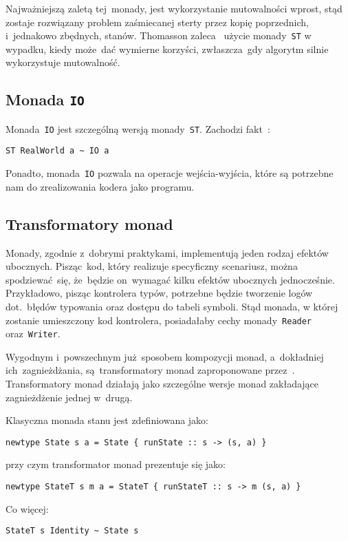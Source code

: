 \documentclass[../../thesis.tex]{subfiles}
\begin{document}
Najważniejszą zaletą tej~monady, jest wykorzystanie mutowalności wprost, stąd zostaje rozwiązany
problem zaśmiecanej sterty przez kopię poprzednich, i~jednakowo zbędnych, stanów.
Thomasson zaleca~\cite{Thomasson:HHPP} użycie monady~\texttt{ST} w wypadku, kiedy
może~dać wymierne korzyści, zwłaszcza~gdy algorytm silnie wykorzystuje mutowalność.

\subsection{Monada \texttt{IO}}

Monada~\texttt{IO} jest szczególną wersją monady~\texttt{ST}. Zachodzi fakt~\cite{Snoyman:PH}:
\begin{verbatim}
ST RealWorld a ~ IO a
\end{verbatim}

Ponadto, monada~\texttt{IO} pozwala na operacje wejścia-wyjścia, które są potrzebne nam
do zrealizowania kodera jako programu. 

\subsection{Transformatory monad}

Monady, zgodnie z~dobrymi praktykami, implementują jeden rodzaj efektów ubocznych.
Pisząc~kod, który realizuje specyficzny scenariusz, można spodziewać~się, że~będzie
on~wymagać kilku efektów ubocznych jednocześnie. Przykładowo, pisząc kontrolera typów,
potrzebne będzie tworzenie logów dot.~błędów typowania oraz dostępu do tabeli symboli.
Stąd monada, w której zostanie umieszczony kod kontrolera, posiadałaby cechy monady~\texttt{Reader}
oraz~\texttt{Writer}.

Wygodnym i~powszechnym już~sposobem kompozycji monad, a~dokładniej ich~zagnieżdżania, 
są~transformatory monad 
zaproponowane przez~\cite{Jones:FPO}. Transformatory monad działają
jako szczególne wersje monad zakładające zagnieżdżenie jednej w~drugą.

Klasyczna monada stanu jest zdefiniowana jako:
\begin{verbatim}
newtype State s a = State { runState :: s -> (s, a) }
\end{verbatim}
przy czym transformator monad prezentuje się jako:
\begin{verbatim}
newtype StateT s m a = StateT { runStateT :: s -> m (s, a) }
\end{verbatim}
Co więcej:
\begin{verbatim}
StateT s Identity ~ State s
\end{verbatim}
\end{document}
